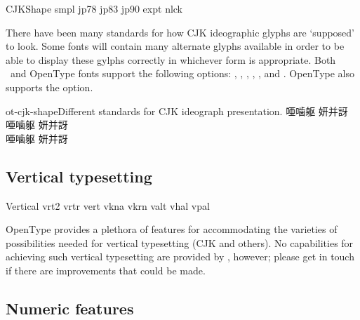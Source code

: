 \begin{features}{CJKShape}
 {smpl}
    {jp78}
    {jp83}
    {jp90}
     {expt}
        {nlck}
\end{features}

There have been many standards for how CJK ideographic
glyphs are `supposed' to look. Some fonts will contain many alternate
glyphs available in order to be able to display these gylphs
correctly in whichever form is appropriate. Both \AAT\ and OpenType
fonts support the following  options:
, , , ,
, and . OpenType also supports the  option.

\begin{Xexample}[firstline=2]{ot-cjk-shape}{Different standards for CJK ideograph presentation.}
  \LARGE\def\text{ 唖噛躯 妍并訝}
  {
  \text }                          \\
  {
  \text }                          \\
  {
  \text }
\end{Xexample}


\subsection{Vertical typesetting}

\begin{features}{Vertical}
         {vrt2}
 {vrtr}
            {vert}
        {vkna}
               {vkrn}
      {valt}
           {vhal}
   {vpal}
\end{features}

OpenType provides a plethora of features for accommodating the varieties of possibilities
needed for vertical typesetting (CJK and others).
No capabilities for achieving such vertical typesetting are provided by ,
however; please get in touch if there are improvements that could be made.


\subsection{Numeric features}

